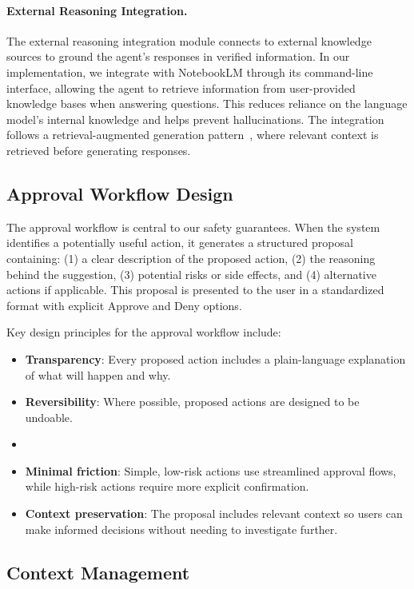 \documentclass[letterpaper,10pt]{article}
\begin{document}
\paragraph{External Reasoning Integration.}
The external reasoning integration module connects to external knowledge sources to ground the agent's responses in verified information. In our implementation, we integrate with NotebookLM through its command-line interface, allowing the agent to retrieve information from user-provided knowledge bases when answering questions. This reduces reliance on the language model's internal knowledge and helps prevent hallucinations. The integration follows a retrieval-augmented generation pattern~\cite{lewis2020retrieval}, where relevant context is retrieved before generating responses.

\subsection{Approval Workflow Design}
\label{subsec:approval_design}

The approval workflow is central to our safety guarantees. When the system identifies a potentially useful action, it generates a structured proposal containing: (1) a clear description of the proposed action, (2) the reasoning behind the suggestion, (3) potential risks or side effects, and (4) alternative actions if applicable. This proposal is presented to the user in a standardized format with explicit Approve and Deny options.

Key design principles for the approval workflow include:
\begin{itemize}
    \item \textbf{Transparency}: Every proposed action includes a plain-language explanation of what will happen and why.
    \item \textbf{Reversibility}: Where possible, proposed actions are designed to be undoable.
    \item \item \textbf{Minimal friction}: Simple, low-risk actions use streamlined approval flows, while high-risk actions require more explicit confirmation.
    \item \textbf{Context preservation}: The proposal includes relevant context so users can make informed decisions without needing to investigate further.
\end{itemize}

\subsection{Context Management}
\label{subsec:context}
\end{document}
